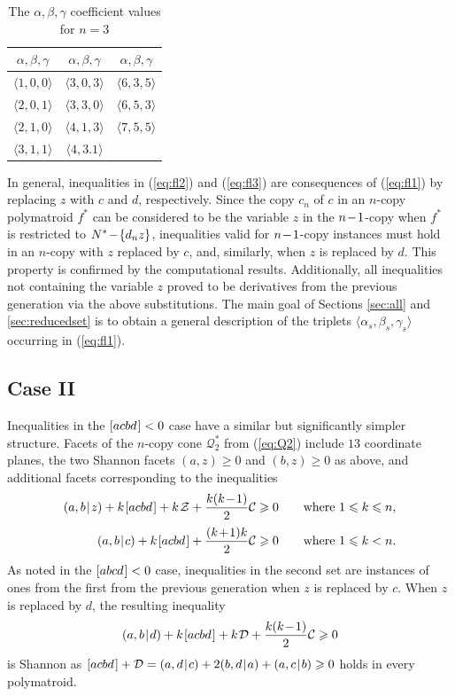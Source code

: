 \documentclass[reqno]{amsart}
\theoremstyle{definition}
\newcommand\tsp{\mkern 1.5mu}
\def\|{\mkern1.5mu{|}\mkern1.5mu}
\renewcommand\ge{\geqslant}\renewcommand\le{\leqslant}
\newcommand\C{\mathcal C}
\newcommand\D{\mathcal D}
\newcommand\Z{\mathcal Z} %
\def\<{\langle}\def\>{\rangle}
\def\m#1{\tsp{#1}\tsp}
\def\sm{\tsp{-}\tsp} %
\def\abcd{[abcd\tsp]}
\def\acbd{[acbd\tsp]}
\begin{document}
\begin{table}[h!tb]\centering\begin{tabular}{c@{\qquad}c@{\qquad}c}
$\alpha,\beta,\gamma$ &
$\alpha,\beta,\gamma$ &
$\alpha,\beta,\gamma$ \\
\hline\rule{0pt}{10.5pt}%
$\<1,0,0\>$  & $\<3,0,3\>$ & $\<6,3,5\>$ \\
$\<2,0,1\>$  & $\<3,3,0\>$ & $\<6,5,3\>$ \\
$\<2,1,0\>$  & $\<4,1,3\>$ & $\<7,5,5\>$ \\
$\<3,1,1\>$  & $\<4,3.1\>$ &           \\
\hline
\end{tabular}
\vskip 5pt
\caption{The $\alpha,\beta,\gamma$ coefficient values for $n=3$}\label{table:sample3}
\end{table}

In general, inequalities in (\ref{eq:fl2}) and (\ref{eq:fl3}) are
consequences of (\ref{eq:fl1}) by replacing $z$ with $c$ and $d$,
respectively. Since the copy $c_n$ of $c$ in an $n$-copy polymatroid $f^*$
can be considered to be the variable $z$ in the $n\m-1$-copy when $f^*$ is
restricted to $N^*\sm\{d_nz\}$, inequalities valid for $n\m-1$-copy
instances must hold in an $n$-copy with $z$ replaced by $c$, and, similarly,
when $z$ is replaced by $d$. This property is confirmed by the computational
results. Additionally, all inequalities not containing the variable $z$
proved to be derivatives from the previous generation via the above
substitutions. The main goal of Sections \ref{sec:all} and
\ref{sec:reducedset} is to obtain a general description of the triplets
$\<\alpha_s,\beta_s,\gamma_s\>$ occurring in (\ref{eq:fl1}).

\subsection{Case II}\label{subsec:resc2}

Inequalities in the $\acbd<0$ case have a similar but significantly simpler
structure. Facets of the $n$-copy cone $\mathcal Q^*_2$ from (\ref{eq:Q2})
include $13$ coordinate planes, the two Shannon facets $(a,z)\ge0$ and
$(b,z)\ge 0$ as above, and additional facets corresponding to the
inequalities
\begin{align*}
   (a,b\|z) +  k\tsp\acbd + k\tsp\Z + \frac{k(k\m-1)} 2 \C &\ge 0
    ~~~~~\mbox{ where } 1\le k \le n, \\[2pt]
 (a,b\|c) + k\tsp\acbd +  \frac{(k\m+1)k} 2 \C &\ge 0
    ~~~~~\mbox { where } 1\le k < n.
\end{align*}
As noted in the $\abcd<0$ case, inequalities in the second set are instances
of ones from the first from the previous generation when $z$ is replaced by
$c$. When $z$ is replaced by $d$, the resulting inequality
$$
   (a,b\|d)+k\tsp\acbd+k\tsp\D + \frac{k(k\m-1)}2 \C \ge 0
$$
is Shannon as $\acbd + \D= (a,d\|c)+2(b,d\|a)+(a,c\|b)\ge 0$ holds in every
polymatroid.
\end{document}
